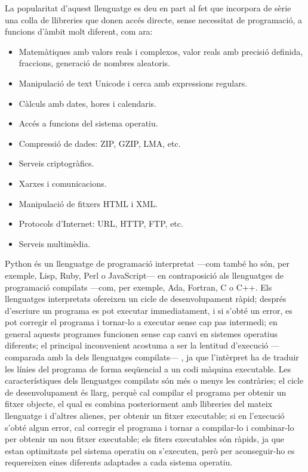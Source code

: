 La popularitat d'aquest llenguatge es deu en part al fet que incorpora de sèrie una colla de llibreries que donen accés directe, sense necessitat de programació, a funcions d'àmbit molt diferent, com ara:
\begin{itemize}
	\item  Matemàtiques amb valors reals i complexos, valor reals amb precisió definida, fraccions, generació de nombres aleatoris.
	\item Manipulació de text Unicode i cerca amb expressions regulars.
	\item Càlculs amb dates, hores i calendaris.
	\item Accés a funcions del sistema operatiu.
	\item Compressió de dades: ZIP, GZIP, LMA, etc.
	\item Serveis criptogràfics.
	\item Xarxes i comunicacions.
	\item Manipulació de fitxers HTML i XML.
	\item Protocols d'Internet: URL, HTTP, FTP, etc.
	\item Serveis multimèdia.
\end{itemize}


Python és un llenguatge de programació interpretat ---com també ho són, per exemple,  Lisp, Ruby, Perl o JavaScript--- en contraposició als llenguatges de programació compilats ---com, per exemple, Ada, Fortran, C o C++. Els llenguatges interpretats ofereixen un cicle de desenvolupament ràpid; després d'escriure un programa es pot executar immediatament, i si s'obté un error, es pot corregir el programa i tornar-lo a executar sense cap pas intermedi; en general aquests programes funcionen sense cap canvi en  sistemes operatius diferents; el principal inconvenient acostuma a ser la lentitud d'execució ---comparada amb la dels llenguatges compilats--- , ja que l'intèrpret ha de traduir les línies del programa de forma seqüencial a un codi màquina executable. Les característiques dels llenguatges compilats són més o menys les contràries; el cicle de desenvolupament és llarg, perquè cal compilar el programa per obtenir un fitxer objecte, el qual es combina posteriorment amb llibreries del mateix llenguatge i d'altres alienes, per obtenir un fitxer executable; si en l'execució s'obté algun error, cal corregir el programa i tornar a compilar-lo i combinar-lo per obtenir un nou fitxer executable; els fiters executables són ràpids, ja que estan optimitzats pel sistema operatiu on s'executen, però per aconseguir-ho  es requereixen eines diferents adaptades a cada sistema operatiu.

